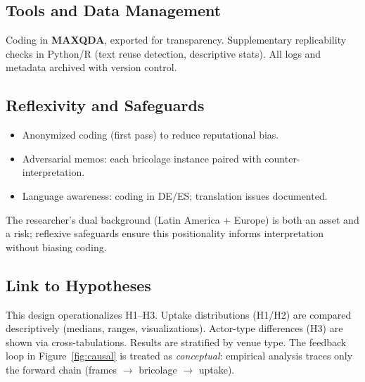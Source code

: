 \subsection*{Tools and Data Management}
Coding in \textbf{MAXQDA}, exported for transparency.  
Supplementary replicability checks in Python/R (text reuse detection, descriptive stats).  
All logs and metadata archived with version control.

\subsection*{Reflexivity and Safeguards}
\begin{itemize}
    \item Anonymized coding (first pass) to reduce reputational bias.  
    \item Adversarial memos: each bricolage instance paired with counter-interpretation.  
    \item Language awareness: coding in DE/ES; translation issues documented.  
\end{itemize}

The researcher’s dual background (Latin America + Europe) is both an asset and a 
risk; reflexive safeguards ensure this positionality informs interpretation 
without biasing coding.

\subsection*{Link to Hypotheses}
This design operationalizes H1–H3. Uptake distributions (H1/H2) are compared 
descriptively (medians, ranges, visualizations). Actor-type differences (H3) 
are shown via cross-tabulations. Results are stratified by venue type.  
The feedback loop in Figure~\ref{fig:causal} is treated as \emph{conceptual}: 
empirical analysis traces only the forward chain (frames $\rightarrow$ bricolage 
$\rightarrow$ uptake).